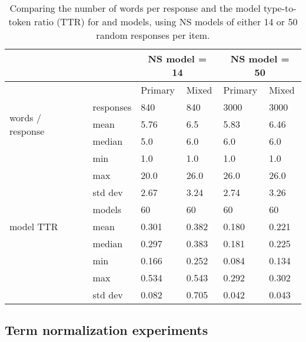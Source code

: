 \begin{table}[htb!]
\begin{center}
\setlength{\tabcolsep}{.6em}
\begin{tabular}{|l|l||l|l||l|l|}
\hline
 && \multicolumn{2}{c||}{NS model = 14} & \multicolumn{2}{c|}{NS model = 50} \\
\hline
	&	& Primary 	& Mixed 	& Primary 	& Mixed  	\\
\hline
\multirow{3}{*}{\begin{sideways}words / response~ \end{sideways}} & responses & 840 & 840 & 3000 & 3000  \\
\cline{2-6}
& mean 		& 5.76 	& 6.5		& 5.83 	& 6.46	 \\
\cline{2-6}
& median 	& 5.0 	& 6.0		& 6.0 	& 6.0	\\
\cline{2-6}
& min 		& 1.0 	& 1.0		& 1.0 	& 1.0	 \\
\cline{2-6}
& max 		& 20.0 	& 26.0		& 26.0 	& 26.0	 \\
\cline{2-6}
& std dev 	& 2.67 	& 3.24		& 2.74 	& 3.26	 \\
\hline
\hline
\multirow{3}{*}{\begin{sideways} model TTR~ \end{sideways}} & models	& 60  & 60 & 60 & 60  \\
\cline{2-6}
& mean 		& 0.301 	& 0.382		& 0.180 	& 0.221	 \\
\cline{2-6}
& median 	& 0.297 	& 0.383		& 0.181 	& 0.225	\\
\cline{2-6}
& min 		& 0.166 	& 0.252		& 0.084 	& 0.134	 \\
\cline{2-6}
& max 		& 0.534 	& 0.543		& 0.292 	& 0.302	 \\
\cline{2-6}
& std dev 	& 0.082 	& 0.705		& 0.042 	& 0.043	 \\
\hline
\end{tabular}
\caption{\label{tab:primacy-model-stats}Comparing the number of words per response and the model type-to-token ratio (TTR) for  and  models, using NS models of either 14 or 50 random responses per item.
}
\end{center}
\end{table}




\subsection{Term normalization experiments}
\label{sec:exp-term-norm}

